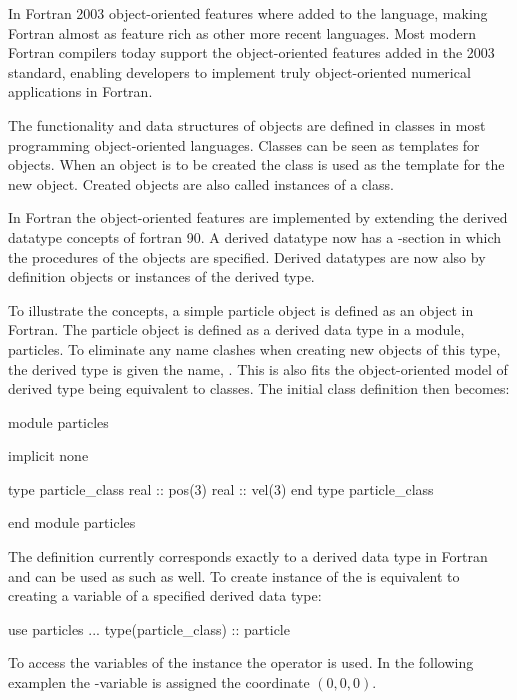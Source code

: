 In Fortran 2003 object-oriented features where added to the language, making Fortran almost as feature rich as other more recent languages. Most modern Fortran compilers today support the object-oriented features added in the 2003 standard, enabling developers to implement truly object-oriented numerical applications in Fortran.

The functionality and data structures of objects are defined in classes in most programming object-oriented languages. Classes can be seen as templates for objects. When an object is to be created the class is used as the template for the new object. Created objects are also called instances of a class.

In Fortran the object-oriented features are implemented by extending the derived datatype concepts of fortran 90. A derived datatype now has a -section in which the procedures of the objects are specified. Derived datatypes are now also by definition objects or instances of the derived type.

To illustrate the concepts, a simple particle object is defined as an object in Fortran. The particle object is defined as a derived data type in a module, particles. To eliminate any name clashes when creating new objects of this type, the derived type is given the name, . This is also fits the object-oriented model of derived type being equivalent to classes. The initial class definition then becomes:

\begin{fortrancodeenv}
module particles

    implicit none

    type particle_class
        real :: pos(3)
        real :: vel(3)
    end type particle_class

end module particles
\end{fortrancodeenv}

The definition currently corresponds exactly to a derived data type in Fortran and can be used as such as well. To create instance of the  is equivalent to creating a variable of a specified derived data type:

\begin{fortrancodeenv}
use particles
...
type(particle_class) :: particle
\end{fortrancodeenv}

To access the variables of the instance the \fkeyw{\%} operator is used. In the following examplen the -variable is assigned the coordinate $(0,0,0)$.

